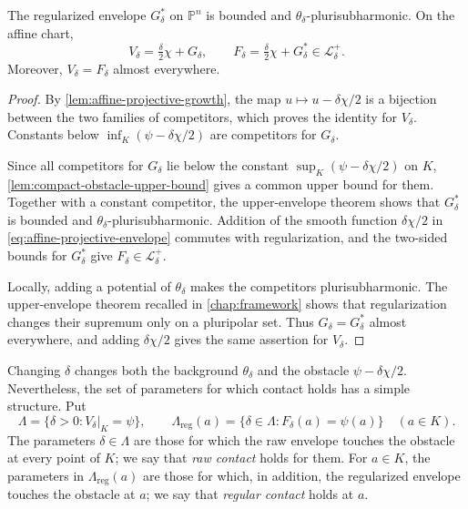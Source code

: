 \begin{proposition}\label{prop:affine-projective-envelope}
The regularized envelope $G_\delta^*$ on $\mathbb P^n$ is bounded and $\theta_\delta$-plurisubharmonic. On the affine chart,
\begin{equation}\label{eq:affine-projective-envelope}
 V_\delta=\tfrac\delta2\chi+G_\delta,\qquad
 F_\delta=\tfrac\delta2\chi+G_\delta^*\in\mathcal L_\delta^+.
\end{equation}
Moreover, $V_\delta=F_\delta$ almost everywhere.
\end{proposition}
\begin{proof}
By \cref{lem:affine-projective-growth}, the map $u\mapsto u-\delta\chi/2$ is a bijection between the two families of competitors, which proves the identity for $V_\delta$. Constants below $\inf_K(\psi-\delta\chi/2)$ are competitors for $G_\delta$.

Since all competitors for $G_\delta$ lie below the constant $\sup_K(\psi-\delta\chi/2)$ on $K$, \cref{lem:compact-obstacle-upper-bound} gives a common upper bound for them. Together with a constant competitor, the upper-envelope theorem shows that $G_\delta^*$ is bounded and $\theta_\delta$-plurisubharmonic. Addition of the smooth function $\delta\chi/2$ in \eqref{eq:affine-projective-envelope} commutes with regularization, and the two-sided bounds for $G_\delta^*$ give $F_\delta\in\mathcal L_\delta^+$.

Locally, adding a potential of $\theta_\delta$ makes the competitors plurisubharmonic. The upper-envelope theorem recalled in \cref{chap:framework} shows that regularization changes their supremum only on a pluripolar set. Thus $G_\delta=G_\delta^*$ almost everywhere, and adding $\delta\chi/2$ gives the same assertion for $V_\delta$.
\end{proof}



Changing $\delta$ changes both the background $\theta_\delta$ and the obstacle $\psi-\delta\chi/2$. Nevertheless, the set of parameters for which contact holds has a simple structure. Put
\[
 \Lambda=\{\delta>0:V_\delta|_K=\psi\},\qquad
 \Lambda_{\mathrm{reg}}(a)=
 \{\delta\in\Lambda:F_\delta(a)=\psi(a)\}\quad(a\in K).
\]
The parameters $\delta\in\Lambda$ are those for which the raw envelope touches the obstacle at every point of $K$; we say that \emph{raw contact} holds for them. For $a\in K$, the parameters in $\Lambda_{\mathrm{reg}}(a)$ are those for which, in addition, the regularized envelope touches the obstacle at $a$; we say that \emph{regular contact} holds at $a$.

